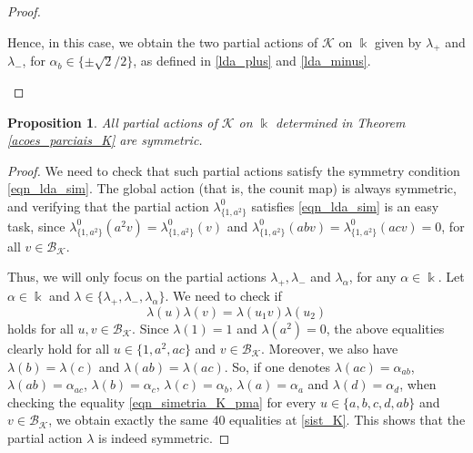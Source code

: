 \documentclass[reqno]{amsart}
\newtheorem{prop}[thm]{Proposition}
\theoremstyle{definition}
\numberwithin{equation}{section}\theoremstyle{plain}
\newcommand{\B}{\mathcal{B}}
\theoremstyle{definition}
\def \k {\Bbbk}
\def \K {\mathcal{K}}
\begin{document}
\begin{proof}
\begin{itemize}
Hence, in this case, we obtain the two partial actions of $\K$ on $\k$ given by $\lambda_+$ and $\lambda_{-}$, for $\alpha_b \in \{\pm \sqrt{2}/{2}\}$, as defined in \eqref{lda_plus} and \eqref{lda_minus}. \qedhere
\end{itemize}
\end{proof}

\begin{prop}
    All partial actions of $\K$ on $\Bbbk$ determined in Theorem \ref{acoes_parciais_K} are symmetric.
\end{prop}

\begin{proof}
We need to check that such partial actions satisfy the symmetry condition \eqref{eqn_lda_sim}.
The global action (that is, the counit map) is always symmetric, and verifying that the partial action $\lambda_{\{1, a^2\}}^0$ satisfies \eqref{eqn_lda_sim} is an easy task, since $\lambda_{\{1, a^2\}}^0(a^2 v) = \lambda_{\{1, a^2\}}^0(v)$ and $\lambda_{\{1, a^2\}}^0(ab v) = \lambda_{\{1, a^2\}}^0(ac v) =0$, for all $v \in \B_\K$.

Thus, we will only focus on the partial actions $\lambda_+, \lambda_{-}$ and $\lambda_\alpha$, for any $\alpha \in \k$.
Let $\alpha\in \Bbbk$ and $\lambda \in \{\lambda_{+}, \lambda_{-}, \lambda_\alpha\}$.
We need to check if 
\begin{equation}\label{eqn_simetria_K_pma}
\lambda(u)\lambda(v) = \lambda(u_1 v) \lambda(u_2)
\end{equation}
holds for all $u, v \in \B_\K.$
Since $\lambda(1)=1$ and $\lambda(a^2)=0$, the above equalities clearly hold for all $u \in \{1, a^2, ac\}$ and $v \in \B_\K$.
Moreover, we also have $\lambda(b)=\lambda(c)$ and $\lambda(ab)=\lambda(ac)$.
So, if one denotes $\lambda(ac)=\alpha_{ab}$, $\lambda(ab)=\alpha_{ac}$, $\lambda(b)=\alpha_{c}$, $\lambda(c)=\alpha_{b}$, $\lambda(a)=\alpha_{a}$ and $\lambda(d)=\alpha_{d}$, when checking the equality \eqref{eqn_simetria_K_pma} for every $u \in \{a, b, c, d, ab \}$ and $v \in \B_\K$, we obtain exactly the same 40 equalities at \eqref{sist_K}. This shows that the partial action \(\lambda\) is indeed symmetric. 
\end{proof}
\end{document}
